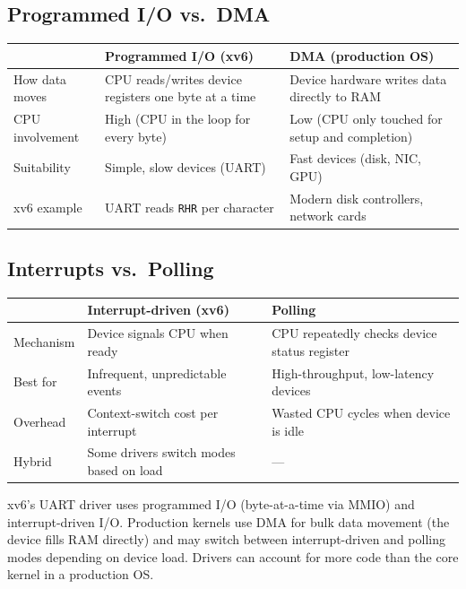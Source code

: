 \documentclass[11pt, a4paper]{article}
\begin{document}
\subsection{Programmed I/O vs.\ DMA}

\begin{center}
\renewcommand{\arraystretch}{1.3}
\begin{tabular}{@{}lp{5.5cm}p{5.5cm}@{}}
\toprule
& \textbf{Programmed I/O (xv6)} & \textbf{DMA (production OS)} \\
\midrule
How data moves & CPU reads/writes device registers one byte at a time & Device hardware writes data directly to RAM \\
CPU involvement & High (CPU in the loop for every byte) & Low (CPU only touched for setup and completion) \\
Suitability & Simple, slow devices (UART) & Fast devices (disk, NIC, GPU) \\
xv6 example & UART reads \lstinline|RHR| per character & Modern disk controllers, network cards \\
\bottomrule
\end{tabular}
\end{center}

\subsection{Interrupts vs.\ Polling}

\begin{center}
\renewcommand{\arraystretch}{1.3}
\begin{tabular}{@{}lp{5.5cm}p{5.5cm}@{}}
\toprule
& \textbf{Interrupt-driven (xv6)} & \textbf{Polling} \\
\midrule
Mechanism & Device signals CPU when ready & CPU repeatedly checks device status register \\
Best for & Infrequent, unpredictable events & High-throughput, low-latency devices \\
Overhead & Context-switch cost per interrupt & Wasted CPU cycles when device is idle \\
Hybrid & Some drivers switch modes based on load & --- \\
\bottomrule
\end{tabular}
\end{center}

\begin{tcolorbox}[summary, title={Section Summary}]
xv6's UART driver uses programmed I/O (byte-at-a-time via MMIO) and interrupt-driven I/O. Production kernels use DMA for bulk data movement (the device fills RAM directly) and may switch between interrupt-driven and polling modes depending on device load. Drivers can account for more code than the core kernel in a production OS.
\end{tcolorbox}
\end{document}
